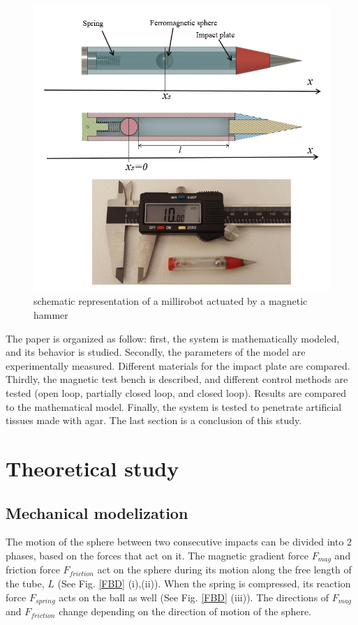 \documentclass[letterpaper, 10 pt, conference]{ieeeconf}  %
\begin{document}
\begin{figure}
  \includegraphics[width=\linewidth]{figure1-2.png}
  \caption{schematic representation of a millirobot actuated by a magnetic hammer}
  \label{millirobot}
\end{figure}

The paper is organized as follow: first, the system is mathematically modeled, and its behavior is studied. Secondly, the parameters of the model are experimentally measured. Different materials for the impact plate are compared. Thirdly, the magnetic test bench is described, and different control methods are tested (open loop, partially closed loop, and closed loop). Results are compared to the mathematical model. Finally, the system is tested to penetrate artificial tissues made with agar. The last section is a conclusion of this study.


\section{Theoretical study}

\subsection{Mechanical modelization}
The motion of the sphere between two consecutive impacts can be divided into 2  phases, based on the forces that act on it. The magnetic gradient force $F_{mag}$ and friction force $F_{friction}$ act on the sphere during its motion along the free length of the tube, $L$ (See Fig. \ref{FBD} (i),(ii)). When the spring is compressed, its reaction force $F_{spring}$ acts on the ball as well (See Fig. \ref{FBD} (iii)). The directions of $F_{mag}$ and $F_{friction}$  change depending on the direction of motion of the sphere. 
\end{document}
